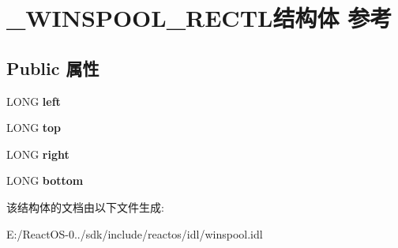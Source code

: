 \hypertarget{struct___w_i_n_s_p_o_o_l___r_e_c_t_l}{}\section{\+\_\+\+W\+I\+N\+S\+P\+O\+O\+L\+\_\+\+R\+E\+C\+T\+L结构体 参考}
\label{struct___w_i_n_s_p_o_o_l___r_e_c_t_l}
\subsection*{Public 属性}
\begin{DoxyCompactItemize}
\item 
\mbox{\label{struct___w_i_n_s_p_o_o_l___r_e_c_t_l_a86d9d15fbb1ad96865b23410ae4b269d}} 
L\+O\+NG {\bfseries left}
\item 
\mbox{\label{struct___w_i_n_s_p_o_o_l___r_e_c_t_l_ad4b1cc09f21c32fb42df09e2281a8a30}} 
L\+O\+NG {\bfseries top}
\item 
\mbox{\label{struct___w_i_n_s_p_o_o_l___r_e_c_t_l_aee21a10cefd8591b099bfef5cd8b6bb8}} 
L\+O\+NG {\bfseries right}
\item 
\mbox{\label{struct___w_i_n_s_p_o_o_l___r_e_c_t_l_a603207bd4c5465c9389ee8507f496c08}} 
L\+O\+NG {\bfseries bottom}
\end{DoxyCompactItemize}


该结构体的文档由以下文件生成\+:\begin{DoxyCompactItemize}
\item 
E\+:/\+React\+O\+S-\/0../sdk/include/reactos/idl/winspool.\+idl\end{DoxyCompactItemize}
